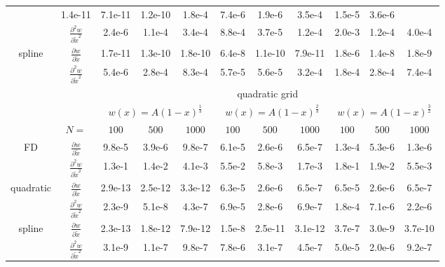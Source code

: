 \begin{tabular}{cc|c|c|c|c|c|c|c|c|c|}
  &1.4e-11  &7.1e-11  &1.2e-10  &1.8e-4  &7.4e-6  &1.9e-6  &3.5e-4  &1.5e-5  &3.6e-6
\\ \cline{2-11}
\multicolumn{1}{|c|}{}                        &
\multicolumn{1}{|c|}{$\frac{\partial^2 w}{\partial \tilde x^2}$}
  &2.4e-6  &1.1e-4  &3.4e-4  &8.8e-4  &3.7e-5  &1.2e-4  &2.0e-3  &1.2e-4  &4.0e-4
\\ \cline{1-11}
\multicolumn{1}{|c|}{\multirow{2}{*}{spline}} &
\multicolumn{1}{|c|}{$\frac{\partial w}{\partial \tilde x}$}
  &1.7e-11  &1.3e-10  &1.8e-10  &6.4e-8  &1.1e-10  &7.9e-11  &1.8e-6  &1.4e-8  &1.8e-9
\\ \cline{2-11}
\multicolumn{1}{|c|}{}                        &
\multicolumn{1}{|c|}{$\frac{\partial^2 w}{\partial \tilde x^2}$}
  &5.4e-6  &2.8e-4  &8.3e-4  &5.7e-5  &5.6e-5  &3.2e-4  &1.8e-4  &2.8e-4  &7.4e-4
\\ \cline{1-11}
& & \multicolumn{9}{|c|}{quadratic grid}
\\ \cline{3-11}
& & \multicolumn{3}{|c|}{$w(x)=A(1-x)^\frac{1}{3}$} &  \multicolumn{3}{|c|}{$w(x)=A(1-x)^\frac{2}{3}$} &  \multicolumn{3}{|c|}{$w(x)=A(1-x)^\frac{3}{2}$}
\\ \cline{2-11}
& \multicolumn{1}{|c|}{$N=$} & $100$ & $500$ & $1000$ & $100$ & $500$ & $1000$ & $100$ & $500$ & $1000$
\\ \cline{1-11}
\multicolumn{1}{|c|}{\multirow{2}{*}{FD}} &
\multicolumn{1}{|c|}{$\frac{\partial w}{\partial \tilde x}$}
  &9.8e-5  &3.9e-6  &9.8e-7  &6.1e-5  &2.6e-6  &6.5e-7  &1.3e-4  &5.3e-6  &1.3e-6
\\ \cline{2-11}
\multicolumn{1}{|c|}{}                        &
\multicolumn{1}{|c|}{$\frac{\partial^2 w}{\partial \tilde x^2}$}
  &1.3e-1  &1.4e-2  &4.1e-3  &5.5e-2  &5.8e-3  &1.7e-3  &1.8e-1  &1.9e-2  &5.5e-3
\\ \cline{1-11}
\multicolumn{1}{|c|}{\multirow{2}{*}{quadratic}} &
\multicolumn{1}{|c|}{$\frac{\partial w}{\partial \tilde x}$}
  &2.9e-13  &2.5e-12  &3.3e-12  &6.3e-5  &2.6e-6  &6.5e-7  &6.5e-5  &2.6e-6  &6.5e-7
\\ \cline{2-11}
\multicolumn{1}{|c|}{}                        &
\multicolumn{1}{|c|}{$\frac{\partial^2 w}{\partial \tilde x^2}$}
  &2.3e-9  &5.1e-8  &4.3e-7  &6.9e-5  &2.8e-6  &6.9e-7  &1.8e-4  &7.1e-6  &2.2e-6
\\ \cline{1-11}
\multicolumn{1}{|c|}{\multirow{2}{*}{spline}} &
\multicolumn{1}{|c|}{$\frac{\partial w}{\partial \tilde x}$}
  &2.3e-13  &1.8e-12  &7.9e-12  &1.5e-8  &2.5e-11  &3.1e-12  &3.7e-7  &3.0e-9  &3.7e-10
\\ \cline{2-11}
\multicolumn{1}{|c|}{}                        &
\multicolumn{1}{|c|}{$\frac{\partial^2 w}{\partial \tilde x^2}$}
  &3.1e-9  &1.1e-7  &9.8e-7  &7.8e-6  &3.1e-7  &4.5e-7  &5.0e-5  &2.0e-6  &9.2e-7
\\ \cline{1-11}
\end{tabular}

